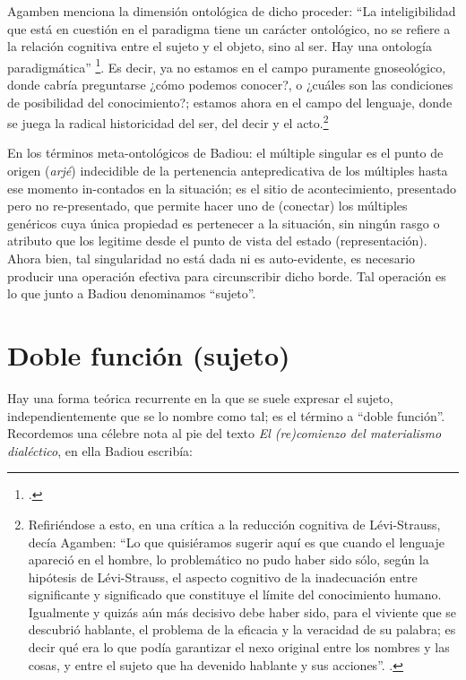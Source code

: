 Agamben menciona la dimensión ontológica de dicho proceder: \enquote{La inteligibilidad que está en cuestión en el paradigma tiene un carácter ontológico, no se refiere a la relación cognitiva entre el sujeto y el objeto, sino al ser. Hay una ontología paradigmática} \footcite[43]{@7070-AGAMBEN2009}. Es decir, ya no estamos en el campo puramente gnoseológico, donde cabría preguntarse ¿cómo podemos conocer?, o ¿cuáles son las condiciones de posibilidad del conocimiento?; estamos ahora en el campo del lenguaje, donde se juega la radical historicidad del ser, del decir y el acto.\footnote{Refiriéndose a esto, en una crítica a la reducción cognitiva de Lévi-Strauss, decía Agamben: \enquote{Lo que quisiéramos sugerir aquí es que cuando  el lenguaje apareció en el hombre, lo problemático no pudo haber sido sólo, según la hipótesis de Lévi-Strauss, el aspecto cognitivo de la inadecuación entre significante y significado que constituye el límite del conocimiento humano. Igualmente y quizás aún más decisivo debe haber sido, para el viviente que se descubrió hablante, el problema de la eficacia y la veracidad de su palabra; es decir qué era lo que podía garantizar el nexo original entre los nombres y las cosas, y entre el sujeto que ha devenido hablante  y sus acciones}. \cite[][105]{@7073-AGAMBEN2010}.}

En los términos meta-ontológicos de Badiou: el múltiple singular es el punto de origen (\emph{arjé}) indecidible de la pertenencia antepredicativa de los múltiples hasta ese momento in-contados en la situación; es el sitio de acontecimiento, presentado pero no re-presentado, que permite hacer uno de (conectar) los múltiples genéricos cuya única propiedad es pertenecer a la situación, sin ningún rasgo o atributo que los legitime desde el punto de vista del estado (representación). Ahora bien, tal singularidad no está dada ni es auto-evidente, es necesario  producir una operación efectiva para circunscribir dicho borde. Tal operación es lo que junto a Badiou denominamos \enquote{sujeto}.

\section{Doble función (sujeto)}


Hay una forma teórica recurrente en la que se suele expresar el sujeto, independientemente que se lo nombre como tal; es el término a \enquote{doble función}. Recordemos una célebre nota al pie del texto \emph{El (re)comienzo del materialismo dialéctico}, en ella Badiou escribía:

